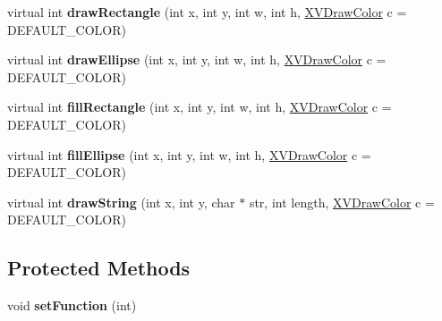 \begin{CompactItemize}
\item 
\label{XVDrawWindowX_a8}
\hypertarget{class_XVDrawWindowX_a8}{
virtual int {\bf draw\-Rectangle} (int x, int y, int w, int h, \hyperlink{class_XVDrawColor}{XVDraw\-Color} c = DEFAULT\_\-COLOR)}

\item 
\label{XVDrawWindowX_a9}
\hypertarget{class_XVDrawWindowX_a9}{
virtual int {\bf draw\-Ellipse} (int x, int y, int w, int h, \hyperlink{class_XVDrawColor}{XVDraw\-Color} c = DEFAULT\_\-COLOR)}

\item 
\label{XVDrawWindowX_a10}
\hypertarget{class_XVDrawWindowX_a10}{
virtual int {\bf fill\-Rectangle} (int x, int y, int w, int h, \hyperlink{class_XVDrawColor}{XVDraw\-Color} c = DEFAULT\_\-COLOR)}

\item 
\label{XVDrawWindowX_a11}
\hypertarget{class_XVDrawWindowX_a11}{
virtual int {\bf fill\-Ellipse} (int x, int y, int w, int h, \hyperlink{class_XVDrawColor}{XVDraw\-Color} c = DEFAULT\_\-COLOR)}

\item 
\label{XVDrawWindowX_a12}
\hypertarget{class_XVDrawWindowX_a12}{
virtual int {\bf draw\-String} (int x, int y, char $\ast$ str, int length, \hyperlink{class_XVDrawColor}{XVDraw\-Color} c = DEFAULT\_\-COLOR)}

\end{CompactItemize}
\subsection*{Protected Methods}
\begin{CompactItemize}
\item 
\label{XVDrawWindowX_b0}
\hypertarget{class_XVDrawWindowX_b0}{
void {\bf set\-Function} (int)}

\end{CompactItemize}

